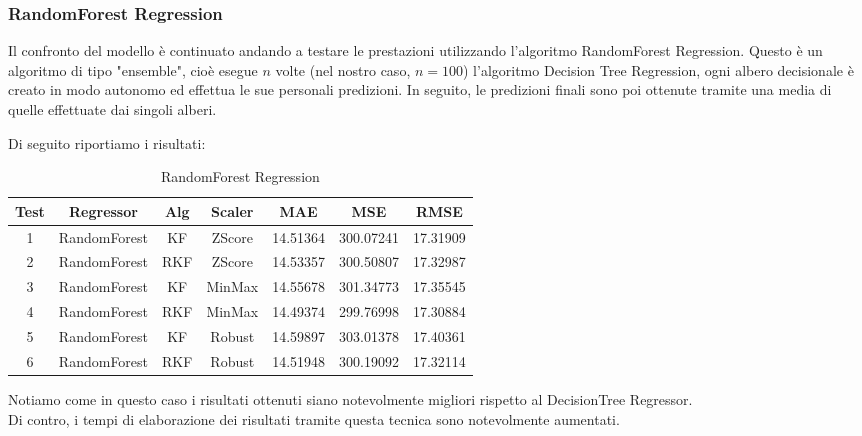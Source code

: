 \subsubsection{RandomForest Regression}
\fancyhead[]{}

Il confronto del modello è continuato andando a testare le prestazioni utilizzando l’algoritmo RandomForest Regression. Questo è un algoritmo di tipo "ensemble", cioè esegue \(n\) volte (nel nostro caso, \(n = 100\)) l’algoritmo Decision Tree Regression, ogni albero decisionale è creato in modo autonomo ed effettua le sue personali predizioni. In seguito, le predizioni finali sono poi ottenute tramite una media di quelle effettuate dai singoli alberi. 

Di seguito riportiamo i risultati:
\begin{table}[!htbp]
    \centering
    \caption{RandomForest Regression}
    \begin{tabular}{|c|c|c|c|c|c|c|}
        \hline
        Test & Regressor & Alg & Scaler & MAE & MSE & RMSE \\
        \hline
        1 & RandomForest & KF & ZScore & 14.51364 & 300.07241 & 17.31909 \\
        \hline
        2 & RandomForest & RKF & ZScore & 14.53357 & 300.50807 & 17.32987 \\
        \hline
        3 & RandomForest & KF & MinMax & 14.55678 & 301.34773 & 17.35545 \\
        \hline
        4 & RandomForest & RKF & MinMax & 14.49374 & 299.76998 & 17.30884 \\
        \hline
        5 & RandomForest & KF & Robust & 14.59897 & 303.01378 & 17.40361 \\
        \hline
        6 & RandomForest & RKF & Robust & 14.51948 & 300.19092 & 17.32114 \\
        \hline
    \end{tabular}
    \label{tab:random_forest}
\end{table} 

\vspace{10pt} 

Notiamo come in questo caso i risultati ottenuti siano notevolmente migliori rispetto al DecisionTree Regressor. \\
Di contro, i tempi di elaborazione dei risultati tramite questa tecnica sono notevolmente aumentati.
